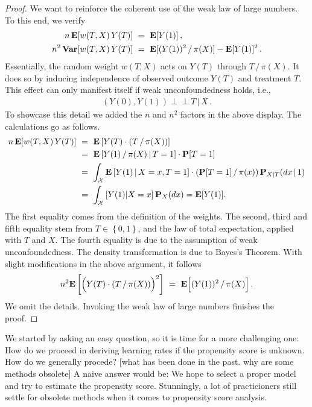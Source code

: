 \begin{proof}
We want to reinforce the coherent use of the weak law of large numbers.
To this end, we verify 
\begin{align*}
  n\,\E[w(T,X)\,Y(T)]
  \ 
  &=
  \ 
  \E[Y(1)]
  \,,
  \\
  n^2\,
  \mathbf{Var}[w(T,X)\,Y(T)]
  \ 
  &=
  \ 
    \E[
    (
      Y(1)
    )^2
    \,/\,
    \pi(X)
    ]
    -
    \E[Y(1)]^2
    \,.
\end{align*}
Essentially, the random weight $w(T,X)$ acts on $Y(T)$ through $T\,/\,\pi(X)$.
It does so by inducing independence of observed outcome $Y(T)$ and treatment $T$.
This effect can only manifest itself if weak unconfoundedness holds, i.e., 
\begin{gather}
  (Y(0),Y(1))\perp\!\!\!\perp T\, |\, X\,.
\end{gather}
To showcase this detail we added the $n$ and $n^2$ factors in the above display.
The calculations go as follows.
\begin{align}
  \begin{split}
  n\,\E[w(T,X)\,Y(T)]
  &\ 
  =
  \ 
  \E
  \left[ 
    Y(T)
    \cdot
    (T\,/\,\pi(X))
  \right]
  \\
  &\ =\ 
  \E
  \left[ 
    Y(1)
    \,
    /
    \,
    \pi(X)
    \,
    \vert
    \,
    T=1
  \right]
  \cdot
  \P[T=1]
  \\
  &\ =\ 
  \int_\mathcal{X}
  \E
  \left[ 
    Y(1)
    \,
    \vert
    \,
    X=x
    ,
    T=1
  \right]
  \cdot
  (
  \P[T=1]
  \,
  /
  \,
  \pi(x)
  )
  \,
  \P_{X|T}(dx\,|\,1)
  \\
  &\ =\ 
  \int_\mathcal{X}
  \left[ 
    Y(1)
    \vert
    X=x
  \right]
  \P_X(dx)
  =
  \E[Y(1)]
  .
\end{split}
\end{align}
The first equality comes from the definition of the weights.
The second, third and fifth equality stem from 
$
  T\in \left\{ 0,1 \right\}
$,
and the law of total expectation, applied with $T$ and $X$.
The fourth equality is due to the assumption of weak unconfoundedness.
The density transformation is due to Bayes's Theorem.
With slight modifications in the above argument, it follows
\begin{gather}
  n^2
  \E
  \left[ 
  \Big( 
    Y(T)
    \cdot
    (T\,/\,\pi(X))
  \Big)
  ^2
  \right]
  \ 
    =
    \ 
    \E
    \Big[
    (Y(1))^2
    \,
    /
    \,
    \pi(X)
    \Big]
    \,.
\end{gather}
We omit the details.
Invoking the weak law of large numbers finishes the proof.
\end{proof}

We started by asking an easy question, so it is time for a more challenging one: How do we proceed in deriving learning rates if the propensity score is unknown.
How do we generally procede?
[what has been done in the past. why are some methods obsolete]
A naive answer would be: We hope to select a proper model and try to estimate the propensity score.
Stunningly, a lot of practicioners still settle for obsolete methods when it comes to propensity score analysis.



